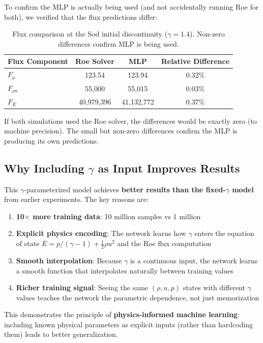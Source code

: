 \documentclass[11pt,a4paper]{article}
\begin{document}
To confirm the MLP is actually being used (and not accidentally running Roe for both), we verified that the flux predictions differ:

\begin{table}[H]
\centering
\begin{tabular}{lccc}
\toprule
Flux Component & Roe Solver & MLP & Relative Difference \\
\midrule
$F_\rho$ & 123.54 & 123.94 & 0.32\% \\
$F_{\rho u}$ & 55,000 & 55,015 & 0.03\% \\
$F_E$ & 40,979,396 & 41,132,772 & 0.37\% \\
\bottomrule
\end{tabular}
\caption{Flux comparison at the Sod initial discontinuity ($\gamma = 1.4$). Non-zero differences confirm MLP is being used.}
\label{tab:verification}
\end{table}

If both simulations used the Roe solver, the differences would be exactly zero (to machine precision). The small but non-zero differences confirm the MLP is producing its own predictions.

\subsection{Why Including $\gamma$ as Input Improves Results}

This $\gamma$-parameterized model achieves \textbf{better results than the fixed-$\gamma$ model} from earlier experiments. The key reasons are:

\begin{enumerate}
    \item \textbf{10$\times$ more training data}: 10 million samples vs 1 million
    \item \textbf{Explicit physics encoding}: The network learns how $\gamma$ enters the equation of state $E = p/(\gamma-1) + \frac{1}{2}\rho u^2$ and the Roe flux computation
    \item \textbf{Smooth interpolation}: Because $\gamma$ is a continuous input, the network learns a smooth function that interpolates naturally between training values
    \item \textbf{Richer training signal}: Seeing the same $(\rho, u, p)$ states with different $\gamma$ values teaches the network the parametric dependence, not just memorization
\end{enumerate}

This demonstrates the principle of \textbf{physics-informed machine learning}: including known physical parameters as explicit inputs (rather than hardcoding them) leads to better generalization.
\end{document}
